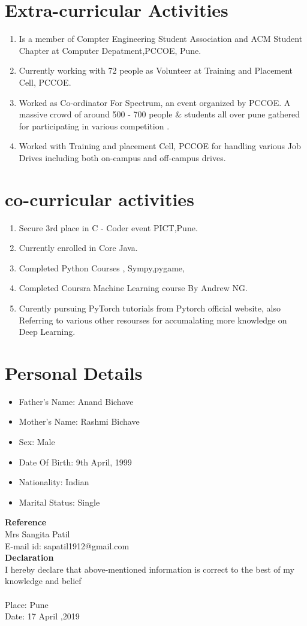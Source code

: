 \documentclass[5pt]{article}
\begin{document}
\section{Extra-curricular Activities}
\begin{enumerate}
\item Is a member of Compter Engineering Student Association and ACM Student Chapter at Computer Depatment,PCCOE, Pune.
\item Currently working with 72 people as Volunteer at Training and Placement Cell, PCCOE.
\item Worked as Co-ordinator For Spectrum, an event organized by PCCOE.  A massive crowd of around 500 - 700 people \& students all over pune gathered for participating in various competition .
\item Worked with Training and placement Cell, PCCOE for handling various Job Drives including both on-campus and off-campus drives.
\end{enumerate}


\section{co-curricular activities}
\begin{enumerate}
\item Secure 3rd place in C - Coder event PICT,Pune.
\item Currently enrolled in Core Java.
\item Completed Python Courses , Sympy,pygame, 
\item Completed Coursra Machine Learning course By Andrew NG. 
\item Curently pursuing PyTorch tutorials from Pytorch official website, also Referring to various other resourses for accumalating more knowledge on Deep Learning.
\end{enumerate}


\section{Personal Details} 
\begin{itemize}

\item{Father's Name: Anand Bichave}
\item{Mother's Name: Rashmi Bichave}
\item{Sex: Male}
\item{Date Of Birth: 9th April, 1999}
\item{Nationality: Indian}
\item{Marital Status: Single}

\end{itemize}

\noindent
\textbf{Reference}
\\
Mrs Sangita Patil\\
E-mail id: sapatil1912@gmail.com\\

\noindent
\textbf{Declaration}
\\
I hereby declare that above-mentioned information is correct to the best of my knowledge and belief\\
\\
Place: Pune\\
Date: 17 April ,2019
\end{document}
